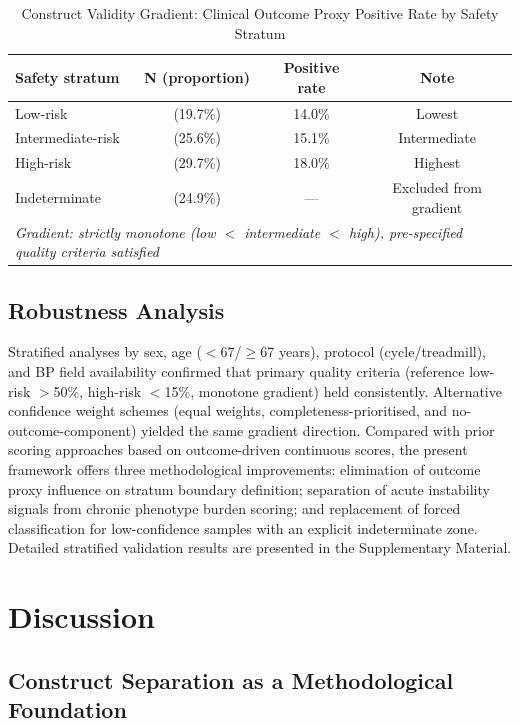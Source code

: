 \documentclass[12pt, a4paper]{article}
\begin{document}
\begin{table}[htbp]
\centering
\small
\caption{Construct Validity Gradient: Clinical Outcome Proxy Positive Rate by Safety Stratum}
\label{tab:construct_validity_en}
\begin{tabular}{lccc}
\toprule
Safety stratum & N (proportion) & Positive rate & Note \\
\midrule
Low-risk & (19.7\%) & 14.0\% & Lowest \\
Intermediate-risk & (25.6\%) & 15.1\% & Intermediate \\
High-risk & (29.7\%) & 18.0\% & Highest \\
Indeterminate & (24.9\%) & — & Excluded from gradient \\
\midrule
\multicolumn{4}{l}{\textit{Gradient: strictly monotone (low $<$ intermediate $<$ high), pre-specified quality criteria satisfied}} \\
\bottomrule
\end{tabular}
\end{table}

\subsection{Robustness Analysis}

Stratified analyses by sex, age ($<$67/$\geq$67 years), protocol
(cycle/treadmill), and BP field availability confirmed that primary quality
criteria (reference low-risk $>$50\%, high-risk $<$15\%, monotone gradient)
held consistently. Alternative confidence weight schemes (equal weights,
completeness-prioritised, and no-outcome-component) yielded the same gradient
direction. Compared with prior scoring approaches based on outcome-driven
continuous scores, the present framework offers three methodological improvements:
elimination of outcome proxy influence on stratum boundary definition;
separation of acute instability signals from chronic phenotype burden scoring;
and replacement of forced classification for low-confidence samples with an
explicit indeterminate zone. Detailed stratified validation results are presented
in the Supplementary Material.

\section{Discussion}

\subsection{Construct Separation as a Methodological Foundation}
\end{document}
